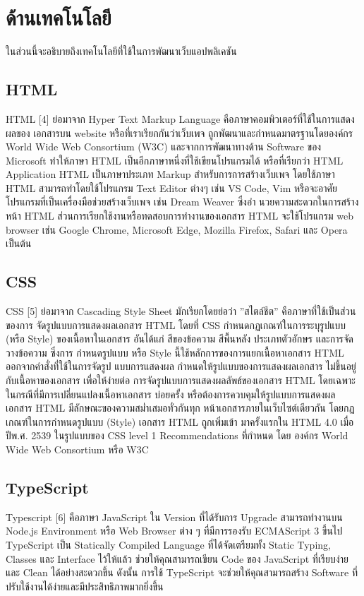 \section{ด้านเทคโนโลยี}

ในส่วนนี้จะอธิบายถึงเทคโนโลยีที่ใช้ในการพัฒนาเว็บแอปพลิเคชัน
\subsection{HTML}

HTML [4] ย่อมาจาก Hyper Text Markup Language คือภาษาคอมพิวเตอร์ที่ใช้ในการแสดงผลของ
เอกสารบน website หรือที่เราเรียกกันว่าเว็บเพจ ถูกพัฒนาและกําหนดมาตรฐานโดยองค์กร World Wide
Web Consortium (W3C) และจากการพัฒนาทางด้าน Software ของ Microsoft ทําให้ภาษา HTML
เป็นอีกภาษาหนึ่งที่ใช้เขียนโปรแกรมได้ หรือที่เรียกว่า HTML Application HTML เป็นภาษาประเภท
Markup สําหรับการการสร้างเว็บเพจ โดยใช้ภาษา HTML สามารถทําโดยใช้โปรแกรม Text Editor ต่างๆ
เช่น VS Code, Vim หรือจะอาศัยโปรแกรมที่เป็นเครื่องมือช่วยสร้างเว็บเพจ เช่น Dream Weaver ซึ่งอํา
นวยความสะดวกในการสร้างหน้า HTML ส่วนการเรียกใช้งานหรือทดสอบการทํางานของเอกสาร HTML
จะใช้โปรแกรม web browser เช่น Google Chrome, Microsoft Edge, Mozilla Firefox, Safari และ
Opera เป็นต้น
\subsection{CSS}

CSS [5] ย่อมาจาก Cascading Style Sheet มักเรียกโดยย่อว่า ”สไตล์ชีต” คือภาษาที่ใช้เป็นส่วนของการ
จัดรูปแบบการแสดงผลเอกสาร HTML โดยที่ CSS กําหนดกฏเกณฑ์ในการระบุรูปแบบ (หรือ Style)
ของเนื้อหาในเอกสาร อันได้แก่ สีของข้อความ สีพื้นหลัง ประเภทตัวอักษร และการจัดวางข้อความ ซึ่งการ
กําหนดรูปแบบ หรือ Style นี้ใช้หลักการของการแยกเนื้อหาเอกสาร HTML ออกจากคําสั่งที่ใช้ในการจัดรูป
แบบการแสดงผล กําหนดให้รูปแบบของการแสดงผลเอกสาร ไม่ขึ้นอยู่กับเนื้อหาของเอกสาร เพื่อให้ง่ายต่อ
การจัดรูปแบบการแสดงผลลัพธ์ของเอกสาร HTML โดยเฉพาะในกรณีที่มีการเปลี่ยนแปลงเนื้อหาเอกสาร
บ่อยครั้ง หรือต้องการควบคุมให้รูปแบบการแสดงผลเอกสาร HTML มีลักษณะของความสมํ่าเสมอทั่วกันทุก
หน้าเอกสารภายในเว็บไซต์เดียวกัน โดยกฏเกณฑ์ในการกําหนดรูปแบบ (Style) เอกสาร HTML ถูกเพิ่มเข้า
มาครั้งแรกใน HTML 4.0 เมื่อปีพ.ศ. 2539 ในรูปแบบของ CSS level 1 Recommendations ที่กําหนด
โดย องค์กร World Wide Web Consortium หรือ W3C

\subsection{TypeScript}

Typescript [6] คือภาษา JavaScript ใน Version ที่ได้รับการ Upgrade สามารถทํางานบน Node.js
Environment หรือ Web Browser ต่าง ๆ ที่มีการรองรับ ECMAScript 3 ขึ้นไป TypeScript เป็น
Statically Compiled Language ที่ได้จัดเตรียมทั้ง Static Typing, Classes และ Interface ไว้ให้แล้ว
ช่วยให้คุณสามารถเขียน Code ของ JavaScript ที่เรียบง่ายและ Clean ได้อย่างสะดวกขึ้น ดังนั้น การใช้
TypeScript จะช่วยให้คุณสามารถสร้าง Software ที่ปรับใช้งานได้ง่ายและมีประสิทธิภาพมากยิ่งขึ้น
